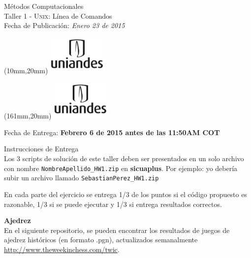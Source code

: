 \documentclass[11pt,letterpaper]{exam}
\begin{document}
\begin{center}
{\Large Métodos Computacionales} \\
Taller 1 - \textsc{Unix}: Línea de Comandos \\
Fecha de Publicación: {\small \it Enero 23 de 2015}\\
\end{center}

\begin{textblock*}{40mm}(10mm,20mm)
  \includegraphics[width=3cm]{logoUniandes.png}
\end{textblock*}

\begin{textblock*}{40mm}(161mm,20mm)
  \includegraphics[width=3cm]{logoUniandes.png}
\end{textblock*}

\vspace{0.5cm}

{\Large Fecha de Entrega:  \bf Febrero 6 de 2015 antes de las 11:50AM COT}

\vspace{0.5cm}

{\Large Instrucciones de Entrega}\\

Los 3 scripts de solución de este taller deben ser presentados en un solo archivo con nombre \verb+NombreApellido_HW1.zip+ en \textbf{sicuaplus}. Por ejemplo: yo deber\'ia subir un archivo llamado \verb"SebastianPerez_HW1.zip"

En cada parte del ejercicio se entrega 1/3  de los puntos si el código propuesto es razonable, 1/3 si se puede ejecutar y 1/3 si entrega resultados correctos.


\vspace{0.5cm}

{\Large\bf Ajedrez}\\

En el siguiente repositorio, se pueden encontrar los resultados de juegos de ajedrez históricos (en formato .pgn), actualizados semanalmente \url{http://www.theweekinchess.com/twic}.
\end{document}
